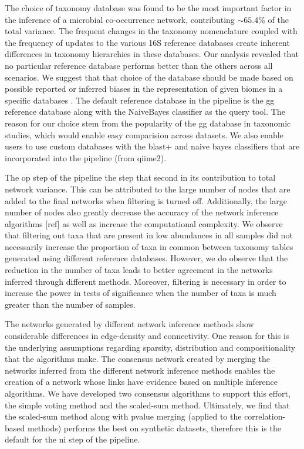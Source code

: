   The choice of taxonomy database was found to be the most important factor in the inference of a microbial co-occurrence network, contributing $\sim65.4\%$ of the total variance.
  The frequent changes in the taxonomy nomenclature coupled with the frequency of updates to the various 16S reference databases create inherent differences \cite{Balvociute2017} in taxonomy hierarchies in these databases.
  Our analysis revealed that no particular reference database performs better than the others across all scenarios. We suggest that that choice of the database should be made based on possible reported or inferred biases in the representation of given biomes in a specific databases \cite{Balvociute2017}.
  The default reference database in the pipeline is the \ac{gg} reference database along with the NaiveBayes classifier as the query tool.
  The reason for our choice stem from the popularity of the \ac{gg} database in taxonomic studies, which would enable easy comparision across datasets.
  We also enable users to use custom databases \cite{Ritari2015} with the blast+ and naive bayes classifiers that are incorporated into the pipeline (from \ac{qiime2}).

  The \ac{op} step of the pipeline the step that second in its contribution to total network variance.
  This can be attributed to the large number of nodes that are added to the final networks when filtering is turned off.
  Additionally, the large number of nodes also greatly decrease the accuracy of the network inference algorithms [ref] as well as increase the computational complexity.
  We observe that filtering out taxa that are present in low abundances in all samples did not necessarily increase the proportion of taxa in common between taxonomy tables generated using different reference databases.
  However, we do observe that the reduction in the number of taxa leads to better agreement in the networks inferred through different methods.
  Moreover, filtering is necessary in order to increase the power in tests of significance when the number of taxa is much greater than the number of samples.

  The networks generated by different network inference methods show considerable differences in edge-density and connectivity.
  One reason for this is the underlying assumptions regarding sparsity, distribution and compositionality that the algorithms make.
  The consensus network created by merging the networks inferred from the different network inference methods enables the creation of a network whose links have evidence based on multiple inference algorithms.
  We have developed two consensus algorithms to support this effort, the simple voting method and the scaled-sum method.
  Ultimately, we find that the scaled-sum method along with pvalue merging (applied to the correlation-based methods) performs the best on synthetic datasets, therefore this is the default for the \ac{ni} step of the pipeline.

